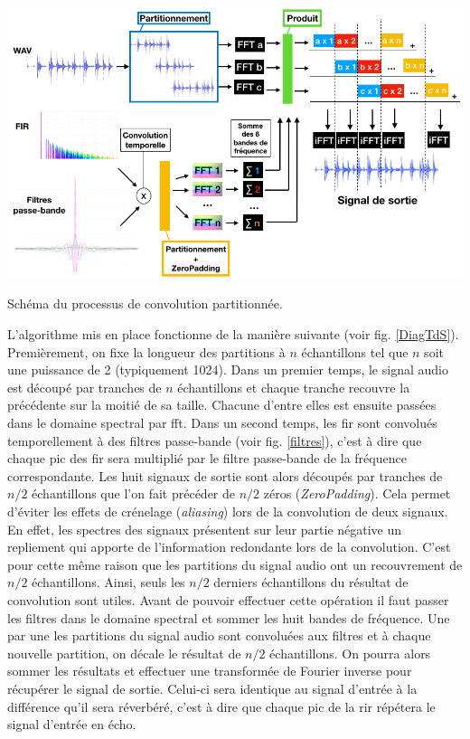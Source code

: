 \begin{figureth}
	\includegraphics[width=\linewidth]{images/DiagTdS}
	\caption{Schéma du processus de convolution partitionnée.}
	\label{DiagTdS}
\end{figureth}
L'algorithme mis en place fonctionne de la manière suivante (voir fig. \ref{DiagTdS}). Premièrement, on fixe la longueur des partitions à $n$ échantillons tel que $n$ soit une puissance de 2 (typiquement 1024). Dans un premier temps, le signal audio est découpé par tranches de $n$ échantillons et chaque tranche recouvre la précédente sur la moitié de sa taille. Chacune d'entre elles est ensuite passées dans le domaine spectral par \gls{fft}. Dans un second temps, les \gls{fir} sont convolués temporellement à des filtres passe-bande (voir fig. \ref{filtres}), c'est à dire que chaque pic des \gls{fir} sera multiplié par le filtre passe-bande de la fréquence correspondante. Les huit signaux de sortie sont alors découpés par tranches de $n/2$ échantillons que l'on fait précéder de $n/2$ zéros (\textit{ZeroPadding}). Cela permet d'éviter les effets de crénelage (\textit{aliasing}) lors de la convolution de deux signaux. En effet, les spectres des signaux présentent sur leur partie négative un repliement qui apporte de l'information redondante lors de la convolution. C'est pour cette même raison que les partitions du signal audio ont un recouvrement de $n/2$ échantillons. Ainsi, seuls les $n/2$ derniers échantillons du résultat de convolution sont utiles. Avant de pouvoir effectuer cette opération il faut passer les filtres dans le domaine spectral et sommer les huit bandes de fréquence. Une par une les partitions du signal audio sont convoluées aux filtres et à chaque nouvelle partition, on décale le résultat de $n/2$ échantillons. On pourra alors sommer les résultats et effectuer une transformée de Fourier inverse pour récupérer le signal de sortie. Celui-ci sera identique au signal d'entrée à la différence qu'il sera réverbéré, c'est à dire que chaque pic de la \gls{rir} répétera le signal d'entrée en écho.
%


